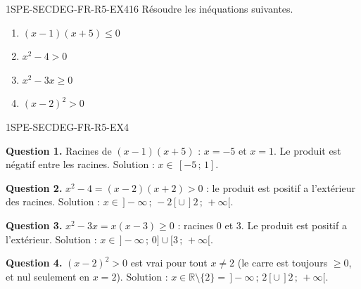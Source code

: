 
\begin{exercice}{1SPE-SECDEG-FR-R5-EX4}{1}{6}
Résoudre les inéquations suivantes.
\begin{enumerate}
  \item $(x-1)(x+5) \leq 0$
  \item $x^2 - 4 > 0$
  \item $x^2 - 3x \geq 0$
  \item $(x-2)^2 > 0$
\end{enumerate}
\end{exercice}


\begin{corrige}{1SPE-SECDEG-FR-R5-EX4}

\textbf{Question 1.} Racines de $(x-1)(x+5)$ : $x = -5$ et $x = 1$. Le produit est négatif entre les racines.
Solution : $x \in \,[-5\,;\,1]$.

\textbf{Question 2.} $x^2 - 4 = (x-2)(x+2) > 0$ : le produit est positif a l'extérieur des racines.
Solution : $x \in \,]-\infty\,;\,-2[ \cup \,]2\,;\,+\infty[$.

\textbf{Question 3.} $x^2 - 3x = x(x-3) \geq 0$ : racines $0$ et $3$. Le produit est positif a l'extérieur.
Solution : $x \in \,]-\infty\,;\,0] \cup [3\,;\,+\infty[$.


\textbf{Question 4.} $(x-2)^2 > 0$ est vrai pour tout $x
\neq 2$ (le carre est toujours $\geq 0$, et nul seulement en $x = 2$).
Solution : $x \in \mathbb{R} \setminus \{2\} = \,]-\infty\,;\,2[ \cup \,]2\,;\,+\infty[$.

\end{corrige}
